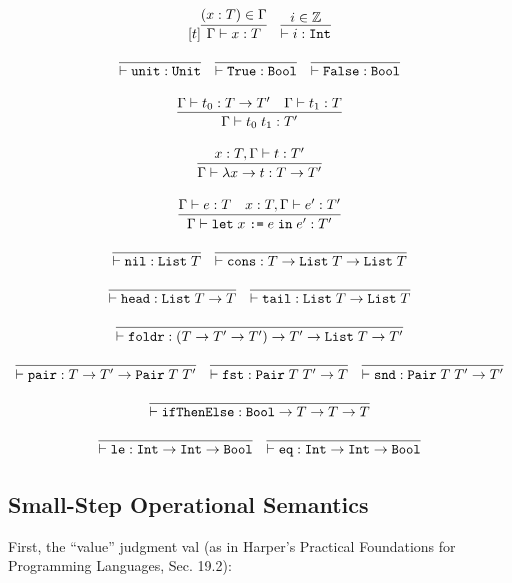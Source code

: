 \documentclass[10pt]{article}
\newcommand{\ttt}[1]{\texttt{#1}}
\newcommand{\ra}{\ensuremath{\rightarrow}}
\newcommand{\Int}{\ttt{Int}}
\newcommand{\Bool}{\ttt{Bool}}
\newcommand{\tyPair}{\ttt{Pair}}
\newcommand{\List}{\ttt{List}}
\newcommand{\letbnd}{\ttt{let}}
\newcommand{\inexpr}{\ttt{in}}
\begin{document}
\[
  \begin{array}{c}[t]
    \infer{\Gamma \vdash x : T}{(x : T) \in \Gamma}
    ~~~
    \infer{\vdash i : \ttt{Int}}{i \in \mathbb{Z}}
    \\\\
    \infer{\vdash \ttt{unit} : \ttt{Unit}}{}
    ~~~
    \infer{\vdash \ttt{True} : \ttt{Bool}}{}
    ~~~
    \infer{\vdash \ttt{False} : \ttt{Bool}}{}
    \\\\
    \infer{\Gamma \vdash t_0\; t_1 : T'}{\Gamma \vdash t_0 : T \ra T' & \Gamma \vdash t_1 : T}
    \\\\
    \infer{\Gamma \vdash \lambda x \ra t : T \ra T'}{x : T, \Gamma \vdash t : T'}
    \\\\
    \infer{\Gamma \vdash \letbnd\; x\; \ttt{:=}\; e\; \inexpr\; e' : T'}{\Gamma \vdash e : T & x : T, \Gamma \vdash e' : T'}
    \\\\
    \infer{\vdash \ttt{nil} : \List\; T}{}
    ~~~
    \infer{\vdash \ttt{cons} : T \ra \List\; T \ra \List\; T}{}
    \\\\
    \infer{\vdash \ttt{head} : \List\; T \ra T}{}
    ~~~
    \infer{\vdash \ttt{tail} : \List\; T \ra \List\; T}{}
    \\\\
    \infer{\vdash \ttt{foldr} : (T \ra T' \ra T') \ra T' \ra \List\; T \ra T'}{}
    \\\\
    \infer{\vdash \ttt{pair} : T \ra T' \ra \tyPair\; T\; T'}{}
    ~~~
    \infer{\vdash \ttt{fst} : \tyPair\; T\; T' \ra T}{}
    ~~~
    \infer{\vdash \ttt{snd} : \tyPair\; T\; T' \ra T'}{}
    \\\\
    \infer{\vdash \ttt{ifThenElse} : \Bool \ra T \ra T \ra T}{}
    \\\\
    \infer{\vdash \ttt{le} : \Int \ra \Int \ra \Bool}{}
    ~~~
    \infer{\vdash \ttt{eq} : \Int \ra \Int \ra \Bool}{}
  \end{array}
\]

\subsection{Small-Step Operational Semantics}

First, the ``value'' judgment val (as in Harper's Practical Foundations for Programming Languages, Sec. 19.2):
\end{document}
